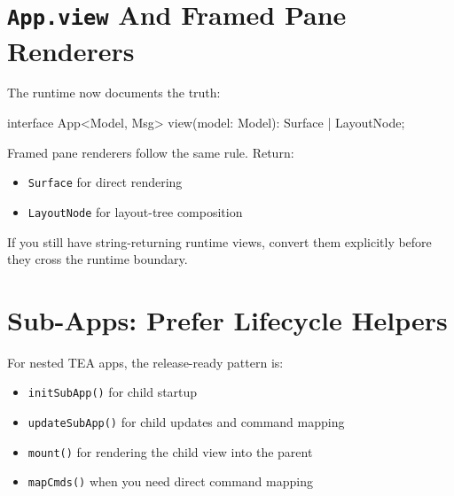 \section{\texorpdfstring{\texttt{A\allowbreak{}p\allowbreak{}p\allowbreak{}.\allowbreak{}v\allowbreak{}i\allowbreak{}e\allowbreak{}w} And Framed Pane Renderers}{ And Framed Pane Renderers}}\label{record-010-app.view-and-framed-pane-renderers}

The runtime now documents the truth:

\begin{CodeBlock}
interface App<Model, Msg> {
  view(model: Model): Surface | LayoutNode;
}
\end{CodeBlock}

Framed pane renderers follow the same rule. Return:

\begin{itemize}
\tightlist
\item
  \texttt{S\allowbreak{}u\allowbreak{}r\allowbreak{}f\allowbreak{}a\allowbreak{}c\allowbreak{}e} for direct rendering
\item
  \texttt{L\allowbreak{}a\allowbreak{}y\allowbreak{}o\allowbreak{}u\allowbreak{}t\allowbreak{}N\allowbreak{}o\allowbreak{}d\allowbreak{}e} for layout-tree composition
\end{itemize}

If you still have string-returning runtime views, convert them explicitly before they cross the runtime boundary.

\section{Sub-Apps: Prefer Lifecycle Helpers}\label{record-010-sub-apps-prefer-lifecycle-helpers}

For nested TEA apps, the release-ready pattern is:

\begin{itemize}
\tightlist
\item
  \texttt{i\allowbreak{}n\allowbreak{}i\allowbreak{}t\allowbreak{}S\allowbreak{}u\allowbreak{}b\allowbreak{}A\allowbreak{}p\allowbreak{}p\allowbreak{}(\allowbreak{})} for child startup
\item
  \texttt{u\allowbreak{}p\allowbreak{}d\allowbreak{}a\allowbreak{}t\allowbreak{}e\allowbreak{}S\allowbreak{}u\allowbreak{}b\allowbreak{}A\allowbreak{}p\allowbreak{}p\allowbreak{}(\allowbreak{})} for child updates and command mapping
\item
  \texttt{m\allowbreak{}o\allowbreak{}u\allowbreak{}n\allowbreak{}t\allowbreak{}(\allowbreak{})} for rendering the child view into the parent
\item
  \texttt{m\allowbreak{}a\allowbreak{}p\allowbreak{}C\allowbreak{}m\allowbreak{}d\allowbreak{}s\allowbreak{}(\allowbreak{})} when you need direct command mapping
\end{itemize}

